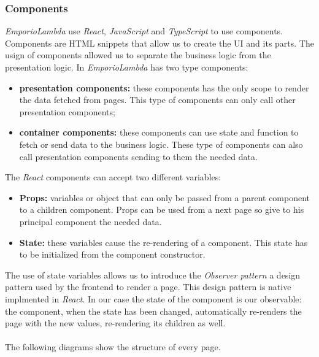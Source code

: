 \subsubsection{Components}
\textit{EmporioLambda} use \textit{React}, \textit{JavaScript} and \textit{TypeScript} to use components. Components are HTML snippets that allow us to create the UI and its parts. The usign of components allowed us to separate the business logic from the presentation logic. In \textit{EmporioLambda} has two type components:
\begin{itemize}
  \item \textbf{presentation components:} these components has the only scope to render the data fetched from pages. This type of components can only call other presentation components;
  \item \textbf{container components:} these components can use state and function to fetch or send data to the business logic. These type of components can also call presentation components sending to them the needed data.
\end{itemize}
The \textit{React} components can accept two different variables:
\begin{itemize}
  \item \textbf{Props:} variables or object that can only be passed from a parent component to a children component. Props can be used from a next page so give to his principal component the needed data.
  \item \textbf{State:} these variables cause the re-rendering of a component. This state has to be initialized from the component constructor.
\end{itemize}
The use of state variables allows us to introduce the \textit{Observer pattern} a design pattern used by the frontend to render a page. This design pattern is native implmented in \textit{React}. In our case the state of the component is our observable: the component, when the state has been changed, automatically re-renders the page with the new values, re-rendering its children as well.
\\
\\
The following diagrams show the structure of every page.
